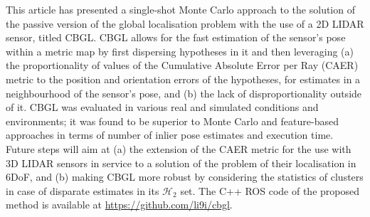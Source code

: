 This article has presented a single-shot Monte Carlo approach to the solution
of the passive version of the global localisation problem with the use of a 2D
LIDAR sensor, titled CBGL. CBGL allows for the fast estimation of the sensor's
pose within a metric map by first dispersing hypotheses in it and then
leveraging (a) the proportionality of values of the Cumulative Absolute Error
per Ray (CAER) metric to the position and orientation errors of the hypotheses,
for estimates in a neighbourhood of the sensor's pose, and (b) the lack of
disproportionality outside of it. CBGL was evaluated in various real and
simulated conditions and environments; it was found to be superior to Monte
Carlo and feature-based approaches in terms of number of inlier pose estimates
and execution time. Future steps will aim at (a) the extension of the CAER
metric for the use with 3D LIDAR sensors in service to a solution of the
problem of their localisation in 6DoF, and (b) making CBGL more robust by
considering the statistics of clusters in case of disparate estimates in its
$\mathcal{H}_2$ set. The C++ ROS code of the proposed method is available at
\url{https://github.com/li9i/cbgl}.
